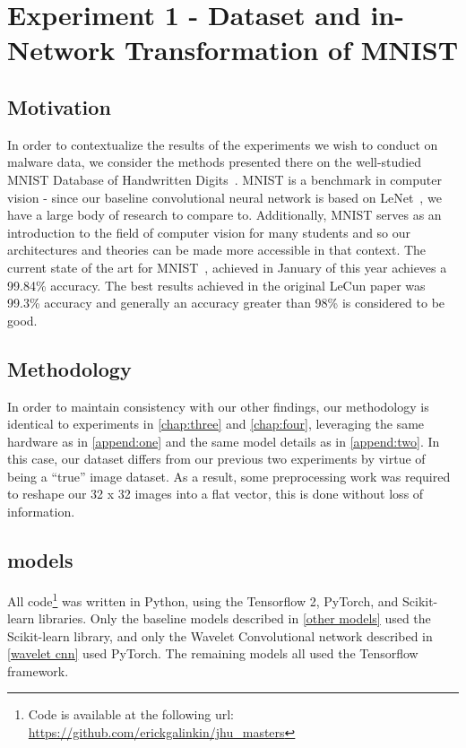 \chapter{Experiment 1 - Dataset and in-Network Transformation of MNIST}
\label{chap:five}

\section{Motivation}
In order to contextualize the results of the experiments we wish to conduct on malware data, we consider the methods presented there on the well-studied MNIST Database of Handwritten Digits~\cite{lecun1998mnist}.
MNIST is a benchmark in computer vision - since our baseline convolutional neural network is based on LeNet~\cite{lecun1998gradient}, we have a large body of research to compare to.
Additionally, MNIST serves as an introduction to the field of computer vision for many students and so our architectures and theories can be made more accessible in that context.
The current state of the art for MNIST~\cite{byerly2020branching}, achieved in January of this year achieves a 99.84\% accuracy.
The best results achieved in the original LeCun paper was 99.3\% accuracy and generally an accuracy greater than 98\% is considered to be good.

\section{Methodology}
In order to maintain consistency with our other findings, our methodology is identical to experiments in \ref{chap:three} and \ref{chap:four}, leveraging the same hardware as in \ref{append:one} and the same model details as in \ref{append:two}.
In this case, our dataset differs from our previous two experiments by virtue of being a ``true'' image dataset. 
As a result, some preprocessing work was required to reshape our 32 x 32 images into a flat vector, this is done without loss of information.

\section{models}
All code\footnote{Code is available at the following url: \url{https://github.com/erickgalinkin/jhu_masters}} was written in Python, using the Tensorflow 2, PyTorch, and Scikit-learn libraries.
Only the baseline models described in \ref{other models} used the Scikit-learn library, and only the Wavelet Convolutional network described in \ref{wavelet cnn} used PyTorch.
The remaining models all used the Tensorflow framework.

